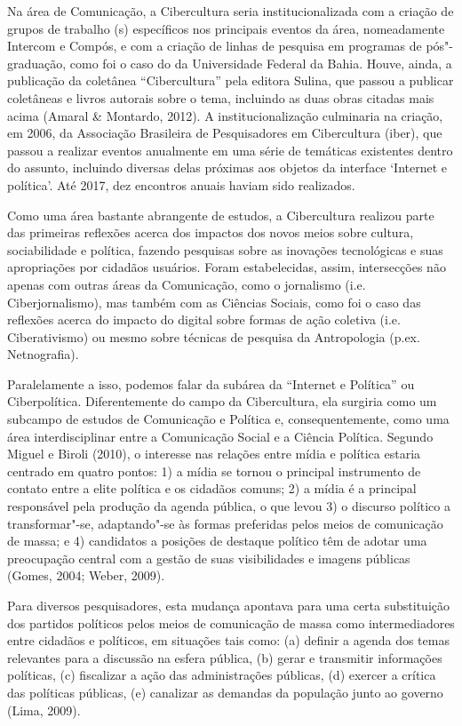 Na área de Comunicação, a Cibercultura seria institucionalizada com a
criação de grupos de trabalho (s) específicos nos principais eventos
da área, nomeadamente Intercom e Compós, e com a criação de linhas de
pesquisa em programas de pós"-graduação, como foi o caso do  da
Universidade Federal da Bahia. Houve, ainda, a publicação da coletânea
``Cibercultura'' pela editora Sulina, que passou a publicar coletâneas e
livros autorais sobre o tema, incluindo as duas obras citadas mais acima
(Amaral \& Montardo, 2012). A institucionalização culminaria na criação,
em 2006, da Associação Brasileira de Pesquisadores em Cibercultura
(iber), que passou a realizar eventos anualmente em uma série de
temáticas existentes dentro do assunto, incluindo diversas delas
próximas aos objetos da interface `Internet e política'. Até 2017, dez
encontros anuais haviam sido realizados.

Como uma área bastante abrangente de estudos, a Cibercultura realizou
parte das primeiras reflexões acerca dos impactos dos novos meios sobre
cultura, sociabilidade e política, fazendo pesquisas sobre as inovações
tecnológicas e suas apropriações por cidadãos usuários. Foram
estabelecidas, assim, intersecções não apenas com outras áreas da
Comunicação, como o jornalismo (i.e. Ciberjornalismo), mas também com as
Ciências Sociais, como foi o caso das reflexões acerca do impacto do
digital sobre formas de ação coletiva (i.e. Ciberativismo) ou mesmo
sobre técnicas de pesquisa da Antropologia (p.ex. Netnografia).

Paralelamente a isso, podemos falar da subárea da ``Internet e
Política'' ou Ciberpolítica. Diferentemente do campo da Cibercultura,
ela surgiria como um subcampo de estudos de Comunicação e Política e,
consequentemente, como uma área interdisciplinar entre a Comunicação
Social e a Ciência Política. Segundo Miguel e Biroli (2010), o interesse
nas relações entre mídia e política estaria centrado em quatro pontos:
1) a mídia se tornou o principal instrumento de contato entre a elite
política e os cidadãos comuns; 2) a mídia é a principal responsável pela
produção da agenda pública, o que levou 3) o discurso político a
transformar"-se, adaptando"-se às formas preferidas pelos meios de
comunicação de massa; e 4) candidatos a posições de destaque político
têm de adotar uma preocupação central com a gestão de suas visibilidades
e imagens públicas (Gomes, 2004; Weber, 2009).

Para diversos pesquisadores, esta mudança apontava para uma certa
substituição dos partidos políticos pelos meios de comunicação de massa
como intermediadores entre cidadãos e políticos, em situações tais como:
(a) definir a agenda dos temas relevantes para a discussão na esfera
pública, (b) gerar e transmitir informações políticas, (c) fiscalizar a
ação das administrações públicas, (d) exercer a crítica das políticas
públicas, (e) canalizar as demandas da população junto ao governo (Lima,
2009).

